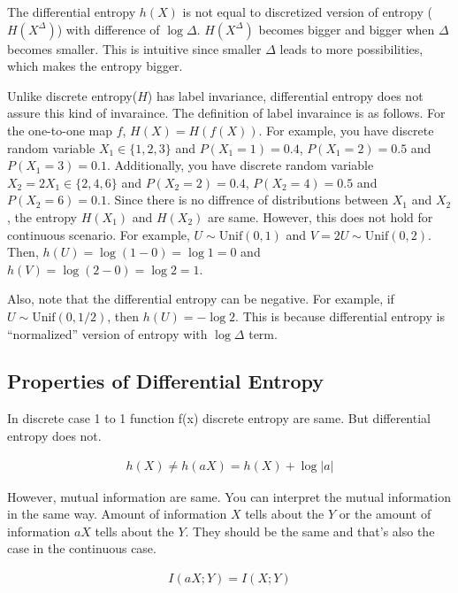 \documentclass{article}
\begin{document}
The differential entropy $h(X)$ is not equal to discretized version of entropy 
($H(X^{\Delta})$) with difference of $\log \Delta$.
$H(X^{\Delta})$ becomes bigger and bigger when $\Delta$ becomes smaller. 
This is intuitive since smaller $\Delta$ leads to more possibilities, 
which makes the entropy bigger. 

Unlike discrete entropy($H$) has label invariance, differential entropy does not 
assure this kind of invaraince. 
The definition of label invaraince is as follows. For the one-to-one map $f$, 
$H(X)=H(f(X))$.
For example, you have discrete random variable $X_1 \in \{1,2,3\}$ and $P(X_1=1)=0.4$, $P(X_1=2)=0.5$ and $P(X_1=3)=0.1$.
Additionally, you have discrete random variable $X_2=2X_1 \in \{2, 4, 6\}$ and $P(X_2=2)=0.4$, $P(X_2=4)=0.5$ and $P(X_2=6)=0.1$.
Since there is no diffrence of distributions between $X_1$ and $X_2$, 
the entropy $H(X_1)$ and $H(X_2)$ are same.  
However, this does not hold for continuous scenario. 
For example, $U \sim \mbox{Unif}(0,1)$ and $V=2U \sim \mbox{Unif}(0,2)$.
Then, $h(U)=\log(1-0)=\log 1=0$ and $h(V)= \log(2-0) = \log2 = 1$.

Also, note that the differential entropy can be negative.
For example, if $U\sim \mbox{Unif}(0, 1/2)$, then $h(U) = -\log 2$.
This is because differential entropy is ``normalized'' version of entropy with $\log \Delta$ term.




\subsection{Properties of Differential Entropy}
In discrete case 1 to 1 function f(x) discrete entropy are same. But differential entropy does not. 

    \begin{align}
        h(X) \neq h(aX) = h(X)+ \log{|a|}
    \end{align}

However, mutual information are same. You can interpret the mutual information in the same way. Amount of information $X$ tells about the $Y$ or the amount of information $aX$ tells about the $Y$. They should be the same and that's also the case in the continuous case.

\begin{theorem}  
\begin{align}
    I(aX;Y)=I(X;Y)
\end{align}  
\end{theorem}
      
\end{document}
